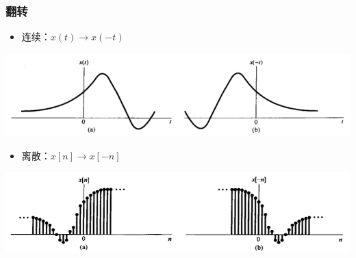 \documentclass[CJKutf8,dvipsnames,table]{beamer}
\begin{document}
\begin{CJK*}{UTF8}{song}
  \begin{frame}
    \frametitle{翻转}
    \begin{itemize}
    \item 连续：$x(t) \rightarrow x(-t)$
    \end{itemize}
    \begin{center}
      \includegraphics[scale=.4]{creversal}
    \end{center}
    \begin{itemize}
    \item 离散：$x[n] \rightarrow x[-n]$    
    \end{itemize}
    \begin{center}
      \includegraphics[scale=.4]{dreversal}
    \end{center}
  \end{frame}  


\end{CJK*}
\end{document}
